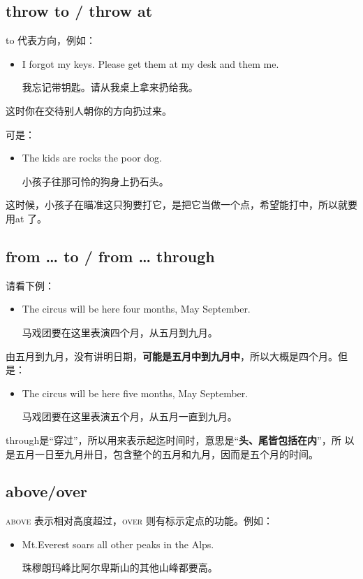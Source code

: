 \subsection{throw to / throw at}

to 代表方向，例如：

\begin{itemize}
\item I forgot my keys. Please get them at my desk and  them
   me.

  我忘记带钥匙。请从我桌上拿来扔给我。
\end{itemize}
这时你在交待别人朝你的方向扔过来。

可是：
\begin{itemize}
\item  The kids are  rocks  the poor dog.

  小孩子往那可怜的狗身上扔石头。
\end{itemize}
这时候，小孩子在瞄准这只狗要打它，是把它当做一个点，希望能打中，所以就要用at
了。

\subsection{from \ldots{} to / from \ldots{} through}

请看下例：
\begin{itemize}
\item The circus will be here four months,  May  September.

  马戏团要在这里表演四个月，从五月到九月。
\end{itemize}
由五月到九月，没有讲明日期，\textbf{可能是五月中到九月中}，所以大概是四个月。但
是：
\begin{itemize}
\item The circus will be here five months,  May  September.

  马戏团要在这里表演五个月，从五月一直到九月。
\end{itemize}
through是“穿过”，所以用来表示起迄时间时，意思是“\textbf{头、尾皆包括在内}”，所
以是五月一日至九月卅日，包含整个的五月和九月，因而是五个月的时间。

\subsection{above/over}

\textsc{above 表示相对高度超过，over 则有标示定点的功能。}例如：
\begin{itemize}
\item  Mt.Everest soars  all other peaks in the Alps.

  珠穆朗玛峰比阿尔卑斯山的其他山峰都要高。
\end{itemize}

